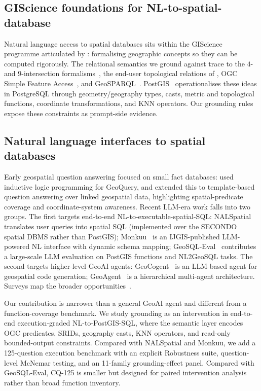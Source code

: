 
\subsection{GIScience foundations for NL-to-spatial-database}

Natural language access to spatial databases sits within the GIScience programme articulated by \citet{goodchild1992gis}: formalising geographic concepts so they can be computed rigorously. The relational semantics we ground against trace to the $4$- and $9$-intersection formalisms~\citep{egenhofer1991topological}, the end-user topological relations of \citet{clementini1993small}, OGC Simple Feature Access~\citep{ogcsfs}, and GeoSPARQL~\citep{ogcgeosparql}. PostGIS~\citep{postgis} operationalises these ideas in PostgreSQL through geometry/geography types, casts, metric and topological functions, coordinate transformations, and KNN operators. Our grounding rules expose these constraints as prompt-side evidence.

\subsection{Natural language interfaces to spatial databases}

Early geospatial question answering focused on small fact databases: \citet{zelle1996geoquery} used inductive logic programming for GeoQuery, and \citet{punjani2018geospatial} extended this to template-based question answering over linked geospatial data, highlighting spatial-predicate coverage and coordinate-system awareness. Recent LLM-era work falls into two groups. The first targets end-to-end NL-to-executable-spatial-SQL: NALSpatial~\citep{liu2025nalspatial} translates user queries into spatial SQL (implemented over the SECONDO spatial DBMS rather than PostGIS); Monkuu~\citep{yu2025monkuu} is an IJGIS-published LLM-powered NL interface with dynamic schema mapping; GeoSQL-Eval~\citep{hou2026geosql} contributes a large-scale LLM evaluation on PostGIS functions and NL2GeoSQL tasks. The second targets higher-level GeoAI agents: GeoCogent~\citep{houcoding2025} is an LLM-based agent for geospatial code generation; GeoAgent~\citep{lin2026geoagent} is a hierarchical multi-agent architecture. Surveys map the broader opportunities~\citep{mai2024foundation}.

Our contribution is narrower than a general GeoAI agent and different from a function-coverage benchmark. We study grounding as an intervention in end-to-end execution-graded NL-to-PostGIS-SQL, where the semantic layer encodes OGC predicates, SRIDs, geography casts, KNN operators, and read-only bounded-output constraints. Compared with NALSpatial and Monkuu, we add a 125-question execution benchmark with an explicit Robustness suite, question-level McNemar testing, and an 11-family grounding-effect panel. Compared with GeoSQL-Eval, CQ-125 is smaller but designed for paired intervention analysis rather than broad function inventory.

